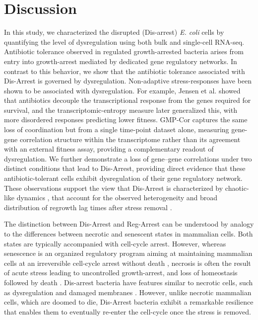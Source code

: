 \documentclass[12pt]{article}
\begin{document}
\section{Discussion}
In this study, we characterized the disrupted (Dis-arrest) \textit{E. coli} cells by quantifying the level of dysregulation using both bulk and single-cell RNA-seq. Antibiotic tolerance observed in regulated growth-arrested bacteria arises from entry into growth-arrest mediated by dedicated gene regulatory networks. In contrast to this behavior, we show that the antibiotic tolerance associated with Dis-Arrest is governed by dysregulation. Non-adaptive stress-responses have been shown to be associated with dysregulation. For example, Jensen et al. showed that antibiotics decouple the transcriptional response from the genes required for survival\cite{Jensen2017}, and the transcriptomic-entropy measure later generalized this, with more disordered responses predicting lower fitness\cite{Zhu2020}. GMP-Cor captures the same loss of coordination but from a single time-point dataset alone, measuring gene-gene correlation structure within the transcriptome rather than its agreement with an external fitness assay, providing a complementary readout of dysregulation. We further demonstrate a loss of gene–gene correlations under two distinct conditions that lead to Dis-Arrest, providing direct evidence that these antibiotic-tolerant cells exhibit dysregulation of their gene regulatory network. These observations support the view that Dis-Arrest is characterized by chaotic-like dynamics \cite{MESTL1996}, that account for the observed heterogeneity and broad distribution of regrowth lag times after stress removal \cite{Kaplan2021}.\par
 The distinction between Dis-Arrest and Reg-Arrest can be understood by analogy to the differences between necrotic and senescent states in mammalian cells. Both states are typically accompanied with cell-cycle arrest. However, whereas senescence is an organized regulatory program aiming at maintaining mammalian cells at an irreversible cell-cycle arrest without death \cite{Campisi2007}, necrosis is often the result of acute stress leading to uncontrolled growth-arrest, and loss of homeostasis followed by death \cite{Galluzzi2018}. Dis-arrest bacteria have features similar to necrotic cells, such as dysregulation and damaged membranes \cite{UnalCevik2003}. However, unlike necrotic mammalian cells, which are doomed to die, Dis-Arrest bacteria exhibit a remarkable resilience that enables them to eventually re-enter the cell-cycle once the stress is removed. \par
\end{document}
